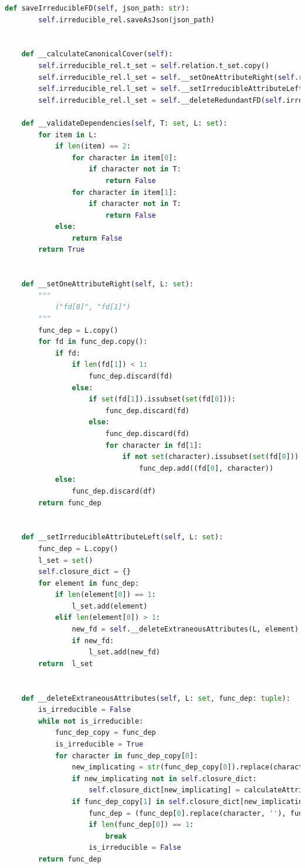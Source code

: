 \documentclass[a4paper,12pt]{article}
\begin{document}
{\begin{lstlisting}[language=python, caption={Clase que calcula la cobertura mínima y valida conjuntos de dependencias equivalentes.\\\hspace{\textwidth}}, captionpos=t]
    def saveIrreducibleFD(self, json_path: str):
        self.irreducible_rel.saveAsJson(json_path)


    def __calculateCanonicalCover(self):
        self.irreducible_rel.t_set = self.relation.t_set.copy()
        self.irreducible_rel.l_set = self.__setOneAttributeRight(self.relation.l_set)
        self.irreducible_rel.l_set = self.__setIrreducibleAttributeLeft(self.irreducible_rel.l_set)
        self.irreducible_rel.l_set = self.__deleteRedundantFD(self.irreducible_rel.l_set)

    def __validateDependencies(self, T: set, L: set):
        for item in L:
            if len(item) == 2:
                for character in item[0]:
                    if character not in T:
                        return False
                for character in item[1]:
                    if character not in T:
                        return False
            else:
                return False
        return True


    def __setOneAttributeRight(self, L: set):
        """
            ("fd[0]", "fd[1]")
        """
        func_dep = L.copy()
        for fd in func_dep.copy():
            if fd:
                if len(fd[1]) < 1:
                    func_dep.discard(fd)
                else:
                    if set(fd[1]).issubset(set(fd[0])):
                        func_dep.discard(fd)
                    else:
                        func_dep.discard(fd)
                        for character in fd[1]:
                            if not set(character).issubset(set(fd[0])):
                                func_dep.add((fd[0], character))
            else:
                func_dep.discard(df)
        return func_dep


    def __setIrreducibleAttributeLeft(self, L: set):
        func_dep = L.copy()
        l_set = set()
        self.closure_dict = {}
        for element in func_dep:
            if len(element[0]) == 1:
                l_set.add(element)
            elif len(element[0]) > 1:
                new_fd = self.__deleteExtraneousAttributes(L, element)
                if new_fd:
                    l_set.add(new_fd)
        return  l_set


    def __deleteExtraneousAttributes(self, L: set, func_dep: tuple):
        is_irreducible = False
        while not is_irreducible:
            func_dep_copy = func_dep
            is_irreducible = True
            for character in func_dep_copy[0]:
                new_implicating = str(func_dep_copy[0]).replace(character, '')
                if new_implicating not in self.closure_dict:
                    self.closure_dict[new_implicating] = calculateAttributeClosure2(new_implicating, L)
                if func_dep_copy[1] in self.closure_dict[new_implicating]:
                    func_dep = (func_dep[0].replace(character, ''), func_dep[1])
                    if len(func_dep[0]) == 1:
                        break
                    is_irreducible = False
        return func_dep


\end{lstlisting}}
\end{document}
